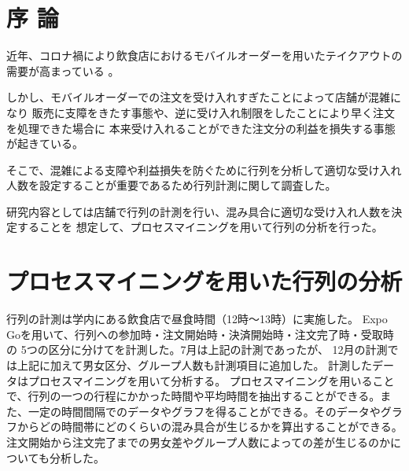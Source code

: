 \documentclass[10pt,twocolumn, a4j]{jsarticle}
\begin{document}

\renewcommand{\thesection}{\arabic{section} .}


\section{序 論}

近年、コロナ禍により飲食店におけるモバイルオーダーを用いたテイクアウトの需要が高まっている
\cite{tyousa1}。

しかし、モバイルオーダーでの注文を受け入れすぎたことによって店舗が混雑になり
販売に支障をきたす事態や、逆に受け入れ制限をしたことにより早く注文を処理できた場合に
本来受け入れることができた注文分の利益を損失する事態が起きている\cite{tyousa2}。

そこで、混雑による支障や利益損失を防ぐために行列を分析して適切な受け入れ人数を設定することが重要であるため行列計測に関して調査した。

研究内容としては店舗で行列の計測を行い、混み具合に適切な受け入れ人数を決定することを
想定して、プロセスマイニングを用いて行列の分析を行った。



\section{プロセスマイニングを用いた行列の分析}

行列の計測は学内にある飲食店で昼食時間（12時〜13時）に実施した。
Expo Goを用いて、行列への参加時・注文開始時・決済開始時・注文完了時・受取時の
5つの区分に分けてを計測した。7月は上記の計測であったが、
12月の計測では上記に加えて男女区分、グループ人数も計測項目に追加した。
計測したデータはプロセスマイニングを用いて分析する。
プロセスマイニングを用いることで、行列の一つの行程にかかった時間や平均時間を抽出することができる。また、一定の時間間隔でのデータやグラフを得ることができる。そのデータやグラフからどの時間帯にどのくらいの混み具合が生じるかを算出することができる。
注文開始から注文完了までの男女差やグループ人数によっての差が生じるのかについても分析した。
\end{document}
